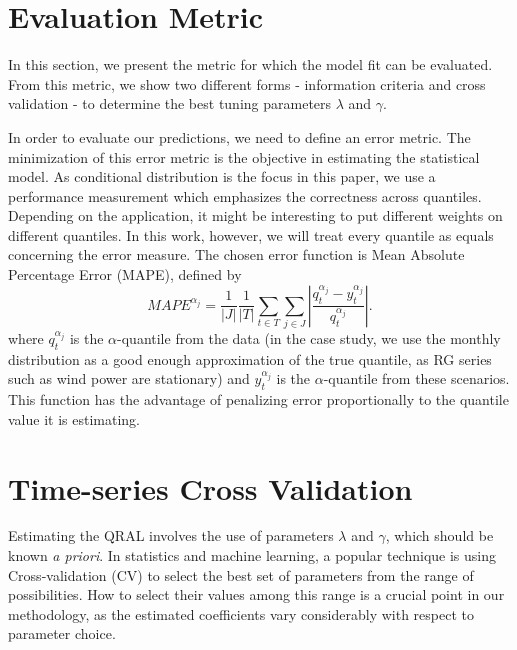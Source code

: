 \section{Evaluation Metric}

In this section, we present the metric for which the model fit can be evaluated. From this metric, we show two different forms - information criteria and cross validation - to determine the best tuning parameters $\lambda$ and $\gamma$.

In order to evaluate our predictions, we need to define an error metric. The minimization of this error metric is the objective in estimating the statistical model. 
As conditional distribution is the focus in this paper, we use a performance measurement which emphasizes the correctness across quantiles. Depending on the application, it might be interesting to put different weights on different quantiles. In this work, however, we will treat every quantile as equals concerning the error measure.
The chosen error function is Mean Absolute Percentage Error (MAPE), defined by
\begin{equation}
MAPE^{\alpha_j}= \frac{1}{|J|} \frac{1}{|T|}  \sum_{t \in T} \sum_{j \in J} \left| \frac{q_t^{\alpha_{j}}- y_t^{\alpha_{j}}}{q_t^{\alpha_{j}}}  \right|. 
\end{equation}
where $q_t^{\alpha_{j}}$ is the $\alpha$-quantile from the data (in the case study, we use the monthly distribution as a good enough approximation of the true quantile, as RG series such as wind power are stationary) and $y_t^{\alpha_j}$ is the $\alpha$-quantile from these scenarios.
This function has the advantage of penalizing error proportionally to the quantile value it is estimating. 


\section{Time-series Cross Validation} \label{sec:cv}

Estimating the QRAL involves the use of parameters $\lambda$ and $\gamma$, which should be known \textit{a priori}. In statistics and machine learning, a popular technique is using Cross-validation (CV) to select the best set of parameters from the range of possibilities. How to select their values among this range is a crucial point in our methodology, as the estimated coefficients vary considerably with respect to parameter choice.


